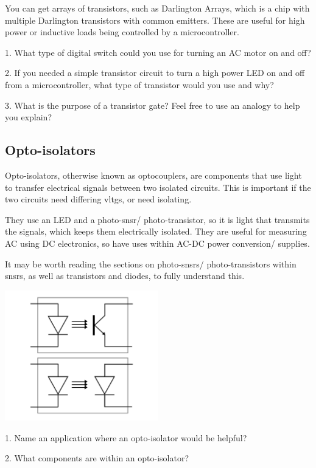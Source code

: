 \documentclass[a4paper,11pt]{report}
\newcommand{\Quiz}[1] %
{
\par\noindent %
\phantomsection %
\todo[inline, color=blue!30]{\textbf{#1}} %
\vspace{1em} %
}
\begin{document}
You can get arrays of transistors, such as Darlington Arrays, which is a chip with multiple Darlington transistors with common emitters. These are useful for high power or inductive loads being controlled by a microcontroller.

\Quiz{Quiz}

1. What type of digital switch could you use for turning an AC motor on and off?

2. If you needed a simple transistor circuit to turn a high power LED on and off from a microcontroller, what type of transistor would you use and why?

3. What is the purpose of a transistor gate? Feel free to use an analogy to help you explain?

\subsection{Opto-isolators}

Opto-isolators, otherwise known as optocouplers, are components that use light to transfer electrical signals between two isolated circuits. This is important if the two circuits need differing \gls{vltg}s, or need isolating.

They use an LED and a photo-\gls{snsr}/ photo-transistor, so it is light that transmits the signals, which keeps them electrically isolated. They are useful for measuring AC using DC electronics, so have uses within AC-DC power conversion/ supplies.

It may be worth reading the sections on photo-\gls{snsr}s/ photo-transistors within \gls{snsr}s, as well as transistors and diodes, to fully understand this.

\includegraphics[width=0.5\textwidth]{optoisolator1}

\Quiz{Quiz}

1. Name an application where an opto-isolator would be helpful?

2. What components are within an opto-isolator?
\end{document}
